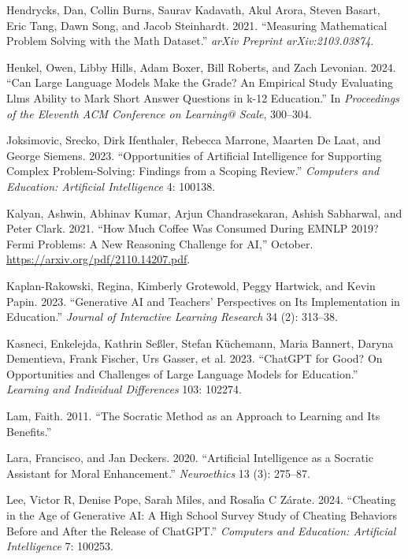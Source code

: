 \documentclass[
  11pt,
]{article}
\newlength{\cslhangindent}
\newenvironment{CSLReferences}[2] %
 {\begin{list}{}{%
  \setlength{\itemindent}{0pt}
  \setlength{\leftmargin}{0pt}
  \setlength{\parsep}{0pt}
  \ifodd #1
   \setlength{\leftmargin}{\cslhangindent}
   \setlength{\itemindent}{-1\cslhangindent}
  \fi
  \setlength{\itemsep}{#2\baselineskip}}}
 {\end{list}}
\begin{document}
\begin{CSLReferences}{1}{0}
Hendrycks, Dan, Collin Burns, Saurav Kadavath, Akul Arora, Steven Basart, Eric Tang, Dawn Song, and Jacob Steinhardt. 2021. {``Measuring Mathematical Problem Solving with the Math Dataset.''} \emph{arXiv Preprint arXiv:2103.03874}.

Henkel, Owen, Libby Hills, Adam Boxer, Bill Roberts, and Zach Levonian. 2024. {``Can Large Language Models Make the Grade? An Empirical Study Evaluating Llms Ability to Mark Short Answer Questions in k-12 Education.''} In \emph{Proceedings of the Eleventh ACM Conference on Learning@ Scale}, 300--304.

Joksimovic, Srecko, Dirk Ifenthaler, Rebecca Marrone, Maarten De Laat, and George Siemens. 2023. {``Opportunities of Artificial Intelligence for Supporting Complex Problem-Solving: Findings from a Scoping Review.''} \emph{Computers and Education: Artificial Intelligence} 4: 100138.

Kalyan, Ashwin, Abhinav Kumar, Arjun Chandrasekaran, Ashish Sabharwal, and Peter Clark. 2021. {``How Much Coffee Was Consumed During EMNLP 2019? Fermi Problems: A New Reasoning Challenge for AI,''} October. \url{https://arxiv.org/pdf/2110.14207.pdf}.

Kaplan-Rakowski, Regina, Kimberly Grotewold, Peggy Hartwick, and Kevin Papin. 2023. {``Generative AI and Teachers' Perspectives on Its Implementation in Education.''} \emph{Journal of Interactive Learning Research} 34 (2): 313--38.

Kasneci, Enkelejda, Kathrin Seßler, Stefan Küchemann, Maria Bannert, Daryna Dementieva, Frank Fischer, Urs Gasser, et al. 2023. {``ChatGPT for Good? On Opportunities and Challenges of Large Language Models for Education.''} \emph{Learning and Individual Differences} 103: 102274.

Lam, Faith. 2011. {``The Socratic Method as an Approach to Learning and Its Benefits.''}

Lara, Francisco, and Jan Deckers. 2020. {``Artificial Intelligence as a Socratic Assistant for Moral Enhancement.''} \emph{Neuroethics} 13 (3): 275--87.

Lee, Victor R, Denise Pope, Sarah Miles, and Rosalı́a C Zárate. 2024. {``Cheating in the Age of Generative AI: A High School Survey Study of Cheating Behaviors Before and After the Release of ChatGPT.''} \emph{Computers and Education: Artificial Intelligence} 7: 100253.


\end{CSLReferences}
\end{document}
